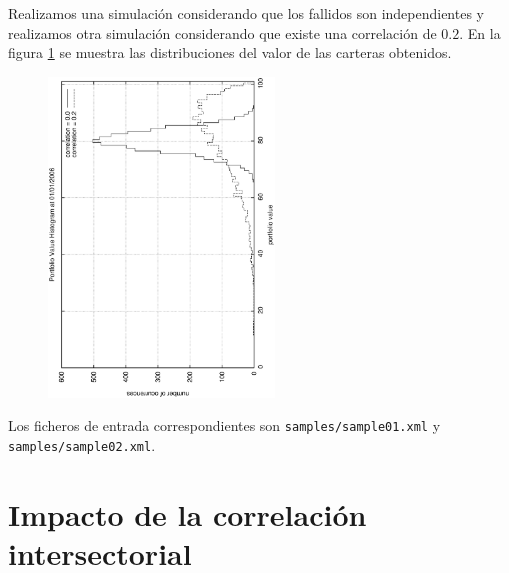 Realizamos una simulaci\'on considerando que los fallidos son independientes y 
realizamos otra simulaci\'on considerando que existe una correlaci\'on de
$0.2$. En la figura \ref{sectorcorrel} se muestra las distribuciones del 
valor de las carteras obtenidos.

\begin{figure}[!hb]
\begin{center}
\includegraphics[width=6cm,angle=-90]{./samples/sectorcorrel.ps}
\caption{}
\label{sectorcorrel}
\end{center}
\end{figure}

Los ficheros de entrada correspondientes son \verb+samples/sample01.xml+ y 
\verb+samples/sample02.xml+.

\section{Impacto de la correlaci\'on intersectorial}

